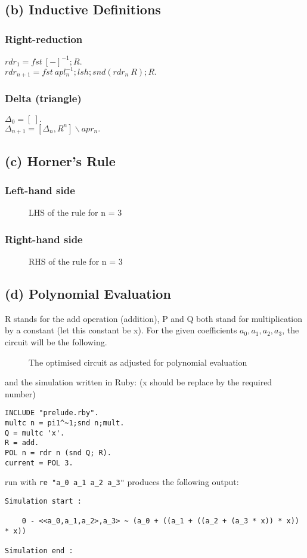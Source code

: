 \documentclass[a4paper,10pt]{article}
\begin{document}
\subsection*{(b) Inductive Definitions}
\subsubsection*{Right-reduction}
$rdr_1 = fst\:  [-]^{-1};R.$ \\[0.25cm]
$rdr_{n+1} = fst\:  apl_{n}^{-1};lsh;snd(rdr_n\: R);R.$
\subsubsection*{Delta (triangle)}
$\Delta_0 = [\: ].$ \\[0.25cm]
$\Delta_{n+1} = [\Delta_{n},R^n]\backslash apr_n.$
\subsection*{(c) Horner's Rule}
\subsubsection*{Left-hand side}
\begin{figure}[H]
\begin{center}

\caption{LHS of the rule for n = 3}
\end{center}
\end{figure}
\subsubsection*{Right-hand side}
\begin{figure}[H]
\begin{center}

\caption{RHS of the rule for n = 3}
\end{center}
\end{figure}
\subsection*{(d) Polynomial Evaluation}
R stands for the add operation (addition), P and Q both stand for multiplication by a constant (let this constant be x).
For the given coefficients $a_0,a_1,a_2,a_3$, the circuit will be the following.
\begin{figure}[H]
\begin{center}

\caption{The optimised circuit as adjusted for polynomial evaluation}
\end{center}
\end{figure}
and the simulation written in Ruby: (x should be replace by the required number)
\begin{Verbatim}
INCLUDE "prelude.rby".
multc n = pi1^~1;snd n;mult.
Q = multc 'x'.
R = add.
POL n = rdr n (snd Q; R).
current = POL 3.
\end{Verbatim}
run with \verb|re "a_0 a_1 a_2 a_3"| produces the following output:
\begin{Verbatim}
Simulation start :

    0 - <<a_0,a_1,a_2>,a_3> ~ (a_0 + ((a_1 + ((a_2 + (a_3 * x)) * x)) * x))

Simulation end :
\end{Verbatim}
\end{document}
